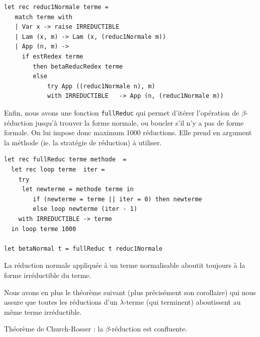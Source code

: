 \begin{Verbatim}
let rec reduc1Normale terme =
   match terme with
   | Var x -> raise IRREDUCTIBLE 
   | Lam (x, m) -> Lam (x, (reduc1Normale m))
   | App (n, m) ->
	 if estRedex terme
		then betaReducRedex terme
		else
			try App ((reduc1Normale n), m)
			with IRREDUCTIBLE   -> App (n, (reduc1Normale m)) 
\end{Verbatim}

Enfin, nous avons une fonction \verb+fullReduc+ qui permet d'itérer l'opération de
$\beta$-réduction jusqu'à trouver la forme normale, ou boucler s'il n'y a pas de forme formale.
On lui impose donc maximum 1000 réductions. 
Elle prend en argument la méthode (ie. la stratégie de réduction) à utiliser. 

\begin{Verbatim}
let rec fullReduc terme methode  =
  let rec loop terme  iter =
	try
	 let newterme = methode terme in
		if (newterme = terme || iter = 0) then newterme
		else loop newterme (iter - 1)
	with IRREDUCTIBLE -> terme	
  in loop terme 1000
	
let betaNormal t = fullReduc t reduc1Normale
\end{Verbatim}

\begin{theoreme}
La réduction normale appliquée à un terme normalisable aboutit toujours à la forme irréductible du terme.
\end{theoreme}

Nous avons en plus le théorème suivant (plus précisément son corollaire) qui nous assure que toutes les réductions d'un $\lambda$-terme (qui terminent) aboutissent au m\^{e}me
terme irréductible.



\begin{theoreme}
Théorème de Church-Rosser : la $\beta $-réduction est confluente.
\end{theoreme}

